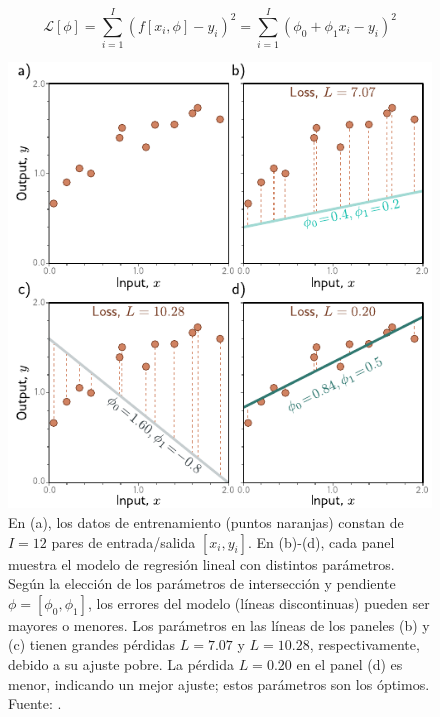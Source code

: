 	
	\begin{equation}
		\label{eq:loss}
		\mathcal{L}[\phi] = \sum_{i=1}^{I} \left( f[x_i, \phi] - y_i \right)^2 = \sum_{i=1}^{I} \left( \phi_0 + \phi_1 x_i - y_i \right)^2
	\end{equation}
	
	
	\begin{figure}[h!]
		\centering
		\includegraphics[width=0.7\linewidth]{graficos/desajuste}
		\caption[Ajuste de la función de perdida.]{En (a), los datos de entrenamiento (puntos naranjas) constan de $I = 12$ pares de entrada/salida $[x_i, y_i]$. En (b)-(d), cada panel muestra el modelo de regresión lineal con distintos parámetros. Según la elección de los parámetros de intersección y pendiente $\phi = [\phi_0 , \phi_1]$, los errores del modelo (líneas discontinuas) pueden ser mayores o menores. Los parámetros en las líneas de los paneles (b) y (c) tienen grandes pérdidas $L = 7.07$ y $L = 10.28$, respectivamente, debido a su ajuste pobre. La pérdida $L = 0.20$ en el panel (d) es menor, indicando un mejor ajuste; estos parámetros son los óptimos. Fuente: \protect\parencite{prince2023understanding}.}
		\label{fig:desajuste}
	\end{figure}
	
